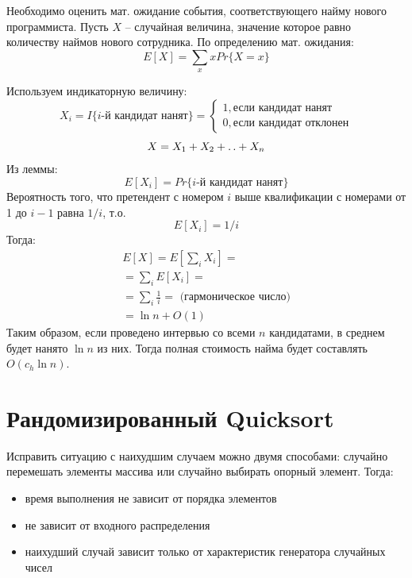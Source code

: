 \documentclass[11pt]{article}
\begin{document}
Необходимо оценить мат. ожидание события, соответствующего найму нового программиста. Пусть $X$ -- случайная величина, значение которое равно количеству наймов нового сотрудника. По определению мат. ожидания:
\begin{equation*}
E[X] = \sum_x x Pr\{X = x\}
\end{equation*}

Используем индикаторную величину:
\begin{equation*}
	X_i = I\{i\text{-й кандидат нанят}\} = \begin{cases}
		1, \text{если кандидат нанят} \\
		0, \text{если кандидат отклонен}
	\end{cases}
\end{equation*}
\begin{equation*}
X = X_1 + X_2 + \mathinner{\ldotp\ldotp} + X_n
\label{l2}
\end{equation*}
Из леммы:
\begin{equation*}
E[X_i] = Pr\{i\text{-й кандидат нанят}\}
\end{equation*}
Вероятность того, что претендент с номером $i$ выше квалификации с номерами от 1 до $i-1$ равна $1/i$, т.о.
\begin{equation*}
E[X_i] = 1/i
\end{equation*}
Тогда:
\begin{align*}
	E[X] = E[\sum_i X_i] = \\
	= \sum_i E[X_i] = \\
	= \sum_i \frac{1}{i} = \text{ (гармоническое число)} \\ 
	= \ln n + O(1)
\end{align*}
Таким образом, если проведено интервью со всеми $n$ кандидатами, в среднем будет нанято $\ln n$ из них. Тогда полная стоимость найма будет составлять $O(c_h \ln n)$.

\section{Рандомизированный Quicksort}

Исправить ситуацию с наихудшим случаем можно двумя способами: случайно перемешать элементы массива или случайно выбирать опорный элемент. Тогда:
\begin{itemize}
\item время выполнения не зависит от порядка элементов
\item не зависит от входного распределения
\item наихудший случай зависит только от характеристик генератора случайных чисел
\end{itemize}
\end{document}
